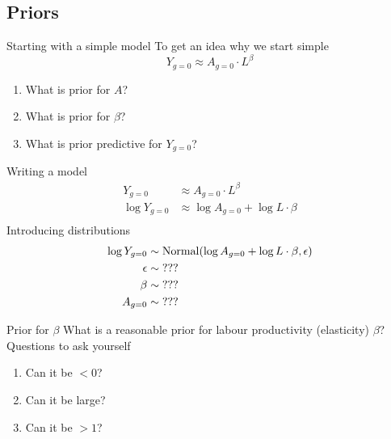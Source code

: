 \documentclass{beamer}
\begin{document}
\subsection{Priors}
\begin{frame}{Starting with a simple model}
    To get an idea why we start simple
    \begin{equation*}
    Y_{g=0} \approx A_{g=0} \cdot L ^ \beta
\end{equation*}
\begin{enumerate}
    \item What is prior for $A$?
    \item What is prior for $\beta$?
    \item What is prior predictive for $Y_{g=0}$?
\end{enumerate}
\end{frame}
\begin{frame}{Writing a model}
    \begin{align*}
        Y_{g=0} &\approx A_{g=0} \cdot L ^ \beta\\
        \log Y_{g=0} &\approx \log A_{g=0} + \log L \cdot \beta\\
    \end{align*}
    Introducing distributions
    \begin{align*}
        \log Y_{g=0} &\sim \operatorname{Normal}(\log A_{g=0} + \log L \cdot \beta, {\epsilon})\\
        {\epsilon} &\sim \text{???}\\
        \beta &\sim \text{???}\\
        A_{g=0} &\sim \text{???}\\
    \end{align*}
\end{frame}
\begin{frame}{Prior for $\beta$}
    What is a reasonable prior for labour productivity (elasticity) $\beta$? Questions to ask yourself
    \begin{enumerate}
        \item Can it be $<0$? \visible<2->{No}
        \item Can it be large? 
        \item Can it be $>1$? 
    \end{enumerate}
\end{frame}
\end{document}
